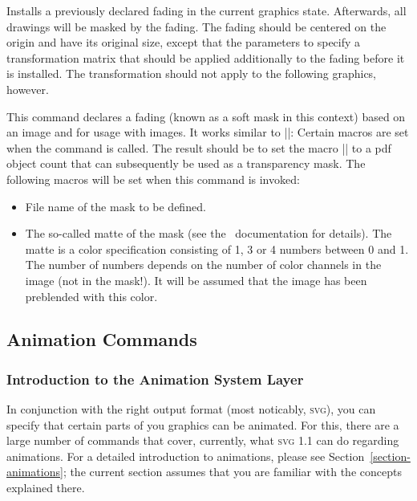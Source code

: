 \begin{command}{\pgfsys@usefading{}}
  Installs a previously declared fading  in the current
  graphics state. Afterwards, all drawings will be masked by the
  fading. The fading should be centered on the origin and have its
  original size, except that the parameters  to 
  specify a transformation matrix that should be applied additionally
  to the fading before it is installed. The transformation should not
  apply to the following graphics, however.
\end{command}


\begin{command}{\pgfsys@definemask}
  This command declares a fading (known as a soft mask in this
  context) based on an image and for usage with images. It
  works similar to |\pgfsys@defineimage|: Certain macros are set when
  the command is called. The result should be to set the macro
  |\pgf@mask| to a pdf object count that can subsequently be used as a
  transparency mask. The following macros will be set when this command is
  invoked:

  \begin{itemize}
  \item \declare{|\pgf@filename|}
    File name of the mask to be defined.

  \item \declare{|\pgf@maskmatte|}
    The so-called matte of the mask (see the \pdf\ documentation for
    details). The matte is a color specification consisting of 1, 3 or
    4 numbers between 0 and 1. The number of numbers depends on the
    number of color channels in the image (not in the mask!). It will
    be assumed that the image has been preblended with this color.
  \end{itemize}
\end{command}


\subsection{Animation Commands}

\subsubsection{Introduction to the Animation System Layer}

In conjunction with the right output format (most noticably,
\textsc{svg}), you can specify that certain parts of you graphics can
be animated. For this, there are a large number of commands that
cover, currently, what \textsc{svg 1.1} can do regarding animations.
For a detailed introduction to animations, please see
Section~\ref{section-animations}; the current section assumes that you
are familiar with the concepts explained there.

